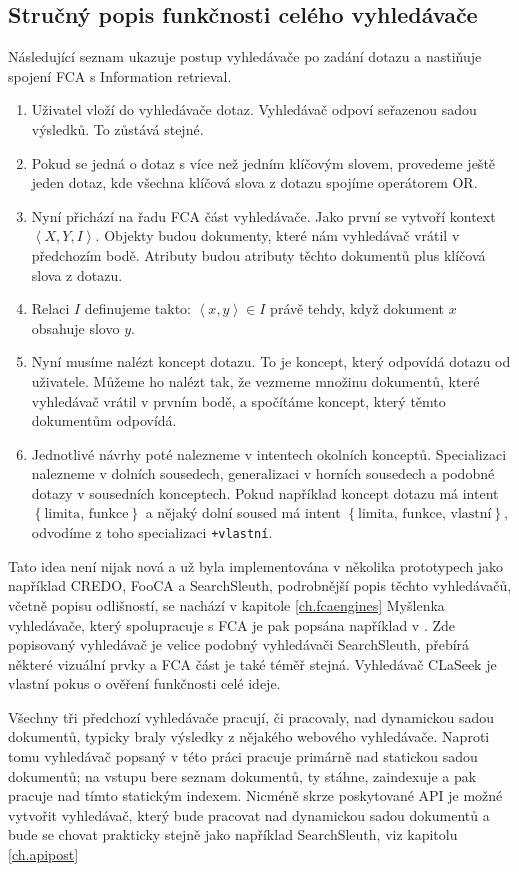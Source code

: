 \documentclass{article}
\newcommand{\name}{CLaSeek}
\newcommand{\code}[1]{\texttt{#1}}
\newcommand{\adds}[1]{\left\{#1\right\}}
\newcommand{\addsp}[1]{\left<#1\right>}
\newcommand{\context}{\addsp{X, Y, I}}
\begin{document}
\subsection{Stručný popis funkčnosti celého vyhledávače}
Následující seznam ukazuje postup vyhledávače po zadání dotazu a nastiňuje spojení FCA s Information retrieval. 
\begin{enumerate}
	\item Uživatel vloží do vyhledávače dotaz. Vyhledávač odpoví seřazenou sadou výsledků. To zůstává stejné.
	\item Pokud se jedná o dotaz s více než jedním klíčovým slovem, provedeme ještě jeden dotaz, kde všechna klíčová slova z dotazu spojíme operátorem OR.
	\item Nyní přichází na řadu FCA část vyhledávače. Jako první se vytvoří kontext $\context$. Objekty budou dokumenty, které nám vyhledávač vrátil v předchozím bodě. Atributy budou atributy těchto dokumentů plus klíčová slova z dotazu. 
	\item Relaci $I$ definujeme takto: $\addsp{x, y}\in I$ právě tehdy, když dokument $x$ obsahuje slovo $y$.
	\item Nyní musíme nalézt koncept dotazu. To je koncept, který odpovídá dotazu od uživatele. Můžeme ho nalézt tak, že vezmeme množinu dokumentů, které vyhledávač vrátil v prvním bodě, a spočítáme koncept, který těmto dokumentům odpovídá. 
	\item Jednotlivé návrhy poté nalezneme v intentech okolních konceptů. Specializaci nalezneme v dolních sousedech, generalizaci v horních sousedech a podobné dotazy v sousedních konceptech. Pokud například koncept dotazu má intent $\adds{\mbox{limita, funkce}}$ a nějaký dolní soused má intent $\adds{\mbox{limita, funkce, vlastní}}$, odvodíme z toho specializaci \code{+vlastní}. 
\end{enumerate}

Tato idea není nijak nová a už byla implementována v několika prototypech jako například CREDO, FooCA a SearchSleuth, podrobnější popis těchto vyhledávačů, včetně popisu odlišností, se nachází v kapitole \ref{ch.fcaengines} Myšlenka vyhledávače, který spolupracuje s FCA je pak popsána například v \cite{fcairslajdy}. Zde popisovaný vyhledávač je velice podobný vyhledávači SearchSleuth, přebírá některé vizuální prvky a FCA část je také téměř stejná. Vyhledávač \name{} je vlastní pokus o ověření funkčnosti celé ideje. 

Všechny tři předchozí vyhledávače pracují, či pracovaly, nad dynamickou sadou dokumentů, typicky braly výsledky z nějakého webového vyhledávače. Naproti tomu vyhledávač popsaný v této práci pracuje primárně nad statickou sadou dokumentů; na vstupu bere seznam dokumentů, ty stáhne, zaindexuje a pak pracuje nad tímto statickým indexem. Nicméně skrze poskytované API je možné vytvořit vyhledávač, který bude pracovat nad dynamickou sadou dokumentů a bude se chovat prakticky stejně jako například SearchSleuth, viz kapitolu \ref{ch.apipost} 
\end{document}
